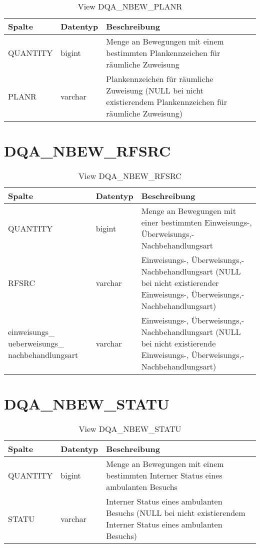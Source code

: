   \begin{table}[ht]
    \centering
    \caption{View DQA\_NBEW\_PLANR}
    \label{tab:dqanbewplanr}
    \begin{tabular}{||l|l|p{10cm}||}
      \hline
      Spalte & Datentyp & Beschreibung \\ [0.5ex] \hline \hline
QUANTITY & bigint & Menge an Bewegungen mit einem bestimmten Plankennzeichen für räumliche Zuweisung \\ \hline
PLANR & varchar & Plankennzeichen für räumliche Zuweisung (NULL bei nicht existierendem Plankennzeichen für räumliche Zuweisung)\\ \hline
    \end{tabular}
  \end{table}
 \clearpage
  \section{DQA\_NBEW\_RFSRC}

  \begin{table}[ht]
    \centering
    \caption{View DQA\_NBEW\_RFSRC}
    \label{tab:dqanbewrfsrc}
    \begin{tabular}{||p{3cm}|l|p{10cm}||}
      \hline
      Spalte & Datentyp & Beschreibung \\ [0.5ex] \hline \hline
QUANTITY & bigint & Menge an Bewegungen mit einer bestimmten Einweisungs-, Überweisungs,- Nachbehandlungsart \\ \hline
RFSRC & varchar & Einweisungs-, Überweisungs,- Nachbehandlungsart (NULL bei nicht existierender Einweisungs-, Überweisungs,- Nachbehandlungsart)\\ \hline
einweisungs\_ ueberweisungs\_ nachbehandlungsart & varchar & Einweisungs-, Überweisungs,- Nachbehandlungsart (NULL bei nicht existierende Einweisungs-, Überweisungs,- Nachbehandlungsart)\\ \hline
    \end{tabular}
  \end{table}

  \section{DQA\_NBEW\_STATU}

  \begin{table}[ht]
    \centering
    \caption{View DQA\_NBEW\_STATU}
    \label{tab:dqanbewstatu}
    \begin{tabular}{||l|l|p{10cm}||}
      \hline
      Spalte & Datentyp & Beschreibung \\ [0.5ex] \hline \hline
QUANTITY & bigint & Menge an Bewegungen mit einem bestimmten Interner Status eines ambulanten Besuchs \\ \hline
STATU & varchar & Interner Status eines ambulanten Besuchs (NULL bei nicht existierendem Interner Status eines ambulanten Besuchs)\\ \hline
    \end{tabular}
  \end{table}
 \clearpage
